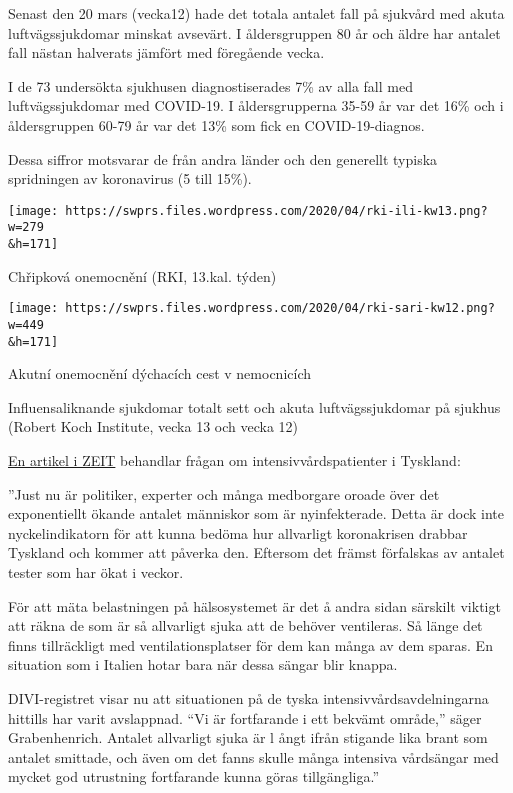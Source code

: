 Senast den 20 mars (vecka12) hade det totala antalet fall på sjukvård
med akuta luftvägssjukdomar minskat avsevärt. I åldersgruppen 80 år och
äldre har antalet fall nästan halverats jämfört med föregående vecka.

I de 73 undersökta sjukhusen diagnostiserades 7\% av alla fall med
luftvägssjukdomar med COVID-19. I åldersgrupperna 35-59 år var det 16\%
och i åldersgruppen 60-79 år var det 13\% som fick en COVID-19-diagnos.

Dessa siffror motsvarar de från andra länder och den generellt typiska
spridningen av koronavirus (5 till 15\%).

\href{https://swprs.files.wordpress.com/2020/04/rki-ili-kw13.png}{}

\texttt{[image: https://swprs.files.wordpress.com/2020/04/rki-ili-kw13.png?w=279\\\&h=171]}

Chřipková onemocnění (RKI, 13.kal. týden)

\href{https://swprs.files.wordpress.com/2020/04/rki-sari-kw12.png}{}

\texttt{[image: https://swprs.files.wordpress.com/2020/04/rki-sari-kw12.png?w=449\\\&h=171]}

Akutní onemocnění dýchacích cest v nemocnicích

Influensaliknande sjukdomar totalt sett och akuta luftvägssjukdomar på
sjukhus (Robert Koch Institute, vecka 13 och vecka 12)

\href{https://www.zeit.de/wissen/2020-04/krankenhaeuser-kapazitaeten-coronavirus-patienten-deutschland/seite-2}{En
artikel i ZEIT} behandlar frågan om intensivvårdspatienter i Tyskland:

''Just nu är politiker, experter och många medborgare oroade över det
exponentiellt ökande antalet människor som är nyinfekterade. Detta är
dock inte nyckelindikatorn för att kunna bedöma hur allvarligt
koronakrisen drabbar Tyskland och kommer att påverka den. Eftersom det
främst förfalskas av antalet tester som har ökat i veckor.

För att mäta belastningen på hälsosystemet är det å andra sidan särskilt
viktigt att räkna de som är så allvarligt sjuka att de behöver
ventileras. Så länge det finns tillräckligt med ventilationsplatser för
dem kan många av dem sparas. En situation som i Italien hotar bara när
dessa sängar blir knappa.

DIVI-registret visar nu att situationen på de tyska
intensivvårdsavdelningarna hittills har varit avslappnad. ``Vi är
fortfarande i ett bekvämt område,'' säger Grabenhenrich. Antalet
allvarligt sjuka är l ångt ifrån stigande lika brant som antalet
smittade, och även om det fanns skulle många intensiva vårdsängar med
mycket god utrustning fortfarande kunna göras tillgängliga.''

